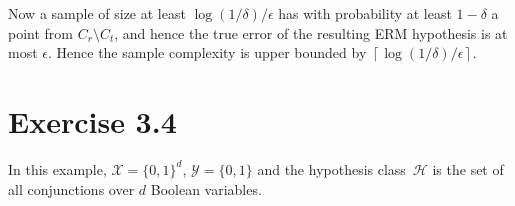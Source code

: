 \documentclass[11pt]{article}
\theoremstyle{definition}
\newcommand{\hypclass}{\ensuremath{\mathcal{H}}}
\newcommand{\dom}{\ensuremath{\mathcal{X}}}
\newcommand{\range}{\ensuremath{\mathcal{Y}}}
\newcommand{\ceiling}[1]{\ensuremath{\left \lceil #1 \right \rceil}}
\begin{document}
Now a sample of size at least $\log(1 / \delta) / \epsilon$ has with probability at least $1 - \delta$ a point from $C_r \setminus C_t$, and hence the true error of the resulting ERM hypothesis is at most $\epsilon$. Hence the sample complexity is upper bounded by $\ceiling{\log(1 / \delta) / \epsilon}$.

\section*{Exercise 3.4}

In this example, $\dom = \{0, 1\}^d$, $\range = \{0, 1\}$ and the hypothesis class~$\hypclass$ is the set of all conjunctions over $d$ Boolean variables. 
\end{document}
